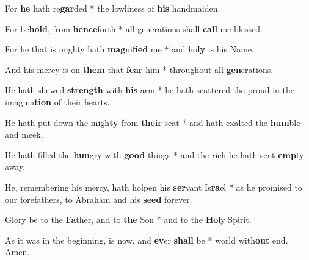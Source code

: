 \begin{multicols}{2}
	For \textbf{he} hath re\textbf{gar}ded * the lowliness of \textbf{his} handmaiden.
	
	For be\textbf{hold}, from \textbf{hence}forth * all generations shall \textbf{call} me blessed.
	
	For he that is mighty hath \textbf{mag}ni\textbf{fied} me * and ho\textbf{ly} is his Name.
	
	And his mercy is on \textbf{them} that \textbf{fear} him * throughout all \textbf{gen}erations.
	
	He hath shewed \textbf{strength} with \textbf{his} arm * he hath scattered the proud in the imagina\textbf{tion} of their hearts.
	
	He hath put down the migh\textbf{ty} from \textbf{their} seat * and hath exalted the \textbf{hum}ble and meek.
	
	He hath filled the \textbf{hun}gry with \textbf{good} things * and the rich he hath sent \textbf{emp}ty away.
	
	He, remembering his mercy, hath holpen his \textbf{ser}vant Is\textbf{ra}el * as he promised to our forefathers, to Abraham and his \textbf{seed} forever.
	
	Glory be to the \textbf{Fa}ther, and to \textbf{the} Son * and to the \textbf{Ho}ly Spirit.
	
	As it was in the beginning, is now, and \textbf{ev}er \textbf{shall} be * world with\textbf{out} end. Amen.
\end{multicols}
